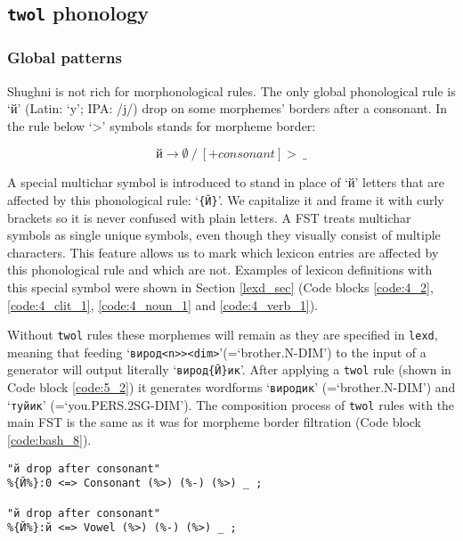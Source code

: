 \subsection{\texttt{twol} phonology}
\subsubsection{Global patterns}
Shughni is not rich for morphonological rules. The only global phonological rule is `й' (Latin: `y'; IPA: /j/) drop on some morphemes' borders after a consonant. In the rule below `>' symbols stands for morpheme border:

\[
й \rightarrow \emptyset 
\ /\ 
[+consonant]
>
\ \_
\]

A special multichar symbol is introduced to stand in place of `й' letters that are affected by this phonological rule: `\texttt{\{Й\}}'. We capitalize it and frame it with curly brackets so it is never confused with plain letters. A FST treats multichar symbols as single unique symbols, even though they visually consist of multiple characters. This feature allows us to mark which lexicon entries are affected by this phonological rule and which are not. Examples of lexicon definitions with this special symbol were shown in Section \ref{lexd_sec} (Code blocks \ref{code:4_2}, \ref{code:4_clit_1}, \ref{code:4_noun_1} and \ref{code:4_verb_1}).

Without \texttt{twol} rules these morphemes will remain as they are specified in \texttt{lexd}, meaning that feeding `\texttt{вирод<n>><dim>}'(=`brother.N-DIM') to the input of a generator will output literally `\texttt{вирод\{Й\}ик}'. After applying a \texttt{twol} rule (shown in Code block \ref{code:5_2}) it generates wordforms `\texttt{виродик}' (=`brother.N-DIM') and `\texttt{туйик}' (=`you.PERS.2SG-DIM'). The composition process of \texttt{twol} rules with the main FST is the same as it was for morpheme border filtration (Code block \ref{code:bash_8}).

\begin{code_frame}[float,floatplacement=!h]
    \begin{footnotesize}\codespacing
    \begin{verbatim}
"й drop after consonant"
%{Й%}:0 <=> Consonant (%>) (%-) (%>) _ ;

"й drop after consonant"
%{Й%}:й <=> Vowel (%>) (%-) (%>) _ ;
    \end{verbatim}
    \end{footnotesize}
    \tcblower
    \label{code:5_2}
\end{code_frame}

